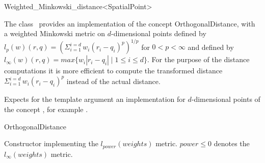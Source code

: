

\begin{ccRefClass}{Weighted_Minkowski_distance<SpatialPoint>}  %


\ccDefinition
   
The class \ccRefName\ provides an implementation of the concept OrthogonalDistance, with a weighted Minkowski metric
on $d$-dimensional points
defined by $l_p(w)(r,q)= ({\Sigma_{i=1}^{i=d} \, w_i(r_i-q_i)^p})^{1/p}$ for $0 < p <\infty$ and
defined by $l_{\infty}(w)(r,q)=max \{w_i |r_i-q_i| \mid 1 \leq i \leq d\}$.
For the purpose of the distance computations it is more efficient to compute
the transformed distance ${\Sigma_{i=1}^{i=d} \, w_i(r_i-q_i)^p}$ instead of the actual distance.


\ccParameters

Expects for the template argument
an implementation for $d$-dimensional points
of the concept ,
for example .

\ccIsModel

OrthogonalDistance

\ccTypes

 

\ccCreation
{}  %


{Constructor implementing the $l_{power}(weights)$ metric. $power \leq 0$ denotes the $l_{\infty}(weights)$ metric.}


\end{ccRefClass}
